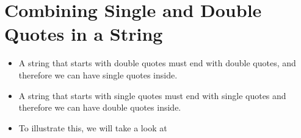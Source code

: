 \documentclass[letterpaper,10pt,english]{sphinxmanual}
\begin{document}
\section{Combining Single and Double Quotes in a String}
\label{\detokenize{lecture_notes/lec03_strings:combining-single-and-double-quotes-in-a-string}}\begin{itemize}
\item {} 
A string that starts with double quotes must end with double quotes,
and therefore we can have single quotes inside.

\item {} 
A string that starts with single quotes must end with single quotes
and therefore we can have double quotes inside.

\item {} 
To illustrate this, we will take a look at

%
\begin{sphinxVerbatim}[commandchars=\\\{\}]
  
  
\end{sphinxVerbatim}

\end{itemize}
\end{document}

